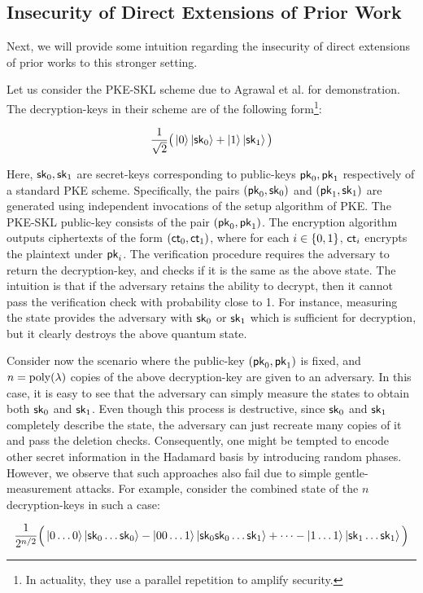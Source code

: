 \subsection{Insecurity of Direct Extensions of Prior Work}

Next, we will provide some intuition regarding the insecurity of
direct extensions of prior works to this stronger setting.

Let us consider the PKE-SKL scheme due to Agrawal et al.
\cite{EC:AKNYY23} for demonstration. The decryption-keys in their
scheme are of the following form\footnote{In actuality, they use a
parallel repetition to amplify security.}:

$$\frac{1}{\sqrt{2}}\big(\ket{0}\ket{\mathsf{sk}_0} + \ket{1}\ket{\mathsf{sk}_1}\big)$$

Here, $\mathsf{sk}_0, \mathsf{sk}_1$ are secret-keys corresponding to public-keys
$\mathsf{pk}_0, \mathsf{pk}_1$ respectively of a standard PKE scheme. Specifically,
the pairs $(\mathsf{pk}_0, \mathsf{sk}_0)$ and $(\mathsf{pk}_1, \mathsf{sk}_1)$ are generated using
independent invocations of the setup algorithm of PKE. The PKE-SKL
public-key consists of the pair $(\mathsf{pk}_0, \mathsf{pk}_1)$. The encryption
algorithm outputs ciphertexts of the form $(\mathsf{ct}_0, \mathsf{ct}_1)$, where for
each $i \in \{0,1\}$, $\mathsf{ct}_i$ encrypts the plaintext under $\mathsf{pk}_i$.  The
verification procedure requires the adversary to return the
decryption-key, and checks if it is the same as the above state. The intuition is that if the adversary retains the ability to decrypt, then it cannot pass the verification check with probability close to 1. For instance, measuring the state provides the adversary with $\mathsf{sk}_0$ or
$\mathsf{sk}_1$ which is sufficient for decryption, but it clearly destroys
the above quantum state.

Consider now the scenario where the public-key $(\mathsf{pk}_0, \mathsf{pk}_1)$ is
fixed, and $n = {\mathrm{poly}}(\lambda)$ copies of the above decryption-key are
given to an adversary. In this case, it is easy to see that the
adversary can simply measure the states to obtain both $\mathsf{sk}_0$ and
$\mathsf{sk}_1$. Even though this process is destructive, since $\mathsf{sk}_0$ and
$\mathsf{sk}_1$ completely describe the state, the adversary can just recreate
many copies of it and pass the deletion checks. Consequently, one
might be tempted to encode other secret information in the Hadamard
basis by introducing random phases. However, we observe that such
approaches also fail due to simple gentle-measurement attacks.  For
example, consider the combined state of the $n$ decryption-keys in
such a case:

$$\frac{1}{2^{n/2}}\Big(\ket{0\ldots0}\ket{\mathsf{sk}_0 \ldots \mathsf{sk}_0} -
\ket{00\ldots1}\ket{\mathsf{sk}_0\mathsf{sk}_0\ldots\mathsf{sk}_1} + \cdots -
\ket{1\ldots1}\ket{\mathsf{sk}_1\ldots\mathsf{sk}_1}\Big)$$

